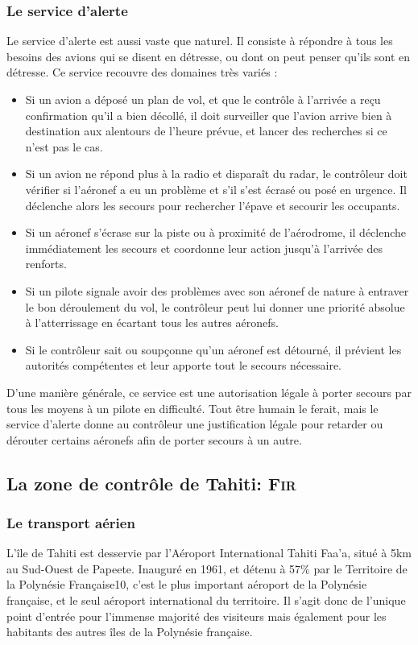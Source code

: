         \subsubsection{Le service d'alerte}
Le service d'alerte est aussi vaste que naturel. Il consiste à répondre à tous les besoins des avions qui se disent en détresse, ou dont on peut penser qu'ils sont en détresse. Ce service recouvre des domaines très variés :
\begin{itemize}
\item Si un avion a déposé un plan de vol, et que le contrôle à l'arrivée a reçu confirmation qu'il a bien décollé, il doit surveiller que l'avion arrive bien à destination aux alentours de l'heure prévue, et lancer des recherches si ce n'est pas le cas.
\item Si un avion ne répond plus à la radio et disparaît du radar, le contrôleur doit vérifier si l'aéronef a eu un problème et s'il s'est écrasé ou posé en urgence. Il déclenche alors les secours pour rechercher l'épave et secourir les occupants.
\item Si un aéronef s'écrase sur la piste ou à proximité de l'aérodrome, il déclenche immédiatement les secours et coordonne leur action jusqu'à l'arrivée des renforts.
\item Si un pilote signale avoir des problèmes avec son aéronef de nature à entraver le bon déroulement du vol, le contrôleur peut lui donner une priorité absolue à l'atterrissage en écartant tous les autres aéronefs.
\item Si le contrôleur sait ou soupçonne qu'un aéronef est détourné, il prévient les autorités compétentes et leur apporte tout le secours nécessaire.
\end{itemize}\medskip

D'une manière générale, ce service est une autorisation légale à porter secours par tous les moyens à un pilote en difficulté. Tout être humain le ferait, mais le service d'alerte donne au contrôleur une justification légale pour retarder ou dérouter certains aéronefs afin de porter secours à un autre.

    \subsection{La zone de contrôle de Tahiti: \textsc{Fir}}
        \subsubsection{Le transport aérien}
L’île de Tahiti est desservie par l'Aéroport International Tahiti Faa'a, situé à 5km au Sud-Ouest de Papeete. Inauguré en 1961, et détenu à 57\% par le Territoire de la Polynésie Française10, c’est le plus important aéroport de la Polynésie française, et le seul aéroport international du territoire. Il s’agit donc de l’unique point d’entrée pour l’immense majorité des visiteurs mais également pour les habitants des autres îles de la Polynésie française.

